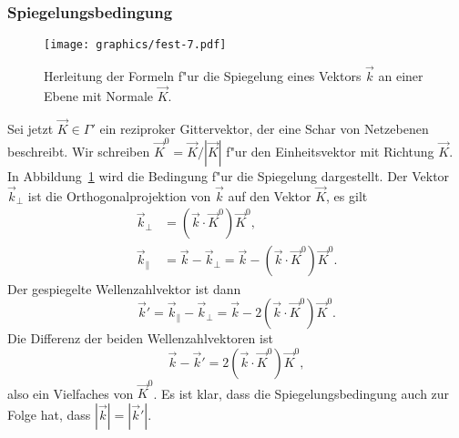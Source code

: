 \subsubsection{Spiegelungsbedingung}
%
\begin{figure}
\centering
\texttt{[image: graphics/fest-7.pdf]}
\caption{Herleitung der Formeln f"ur die Spiegelung eines Vektors $\vec k$
an einer Ebene mit Normale $\vec K$.
\label{skript:spiegelungsbedingung}}
\end{figure}
Sei jetzt $\vec K\in\Gamma'$ ein reziproker Gittervektor, der eine
Schar von Netzebenen beschreibt.
Wir schreiben $\vec K^0=\vec K/|\vec K|$ f"ur den Einheitsvektor mit
Richtung $\vec K$.
In Abbildung~\ref{skript:spiegelungsbedingung} wird die Bedingung f"ur die
Spiegelung dargestellt. 
Der Vektor $\vec k_{\perp}$ ist die Orthogonalprojektion von $\vec k$
auf den Vektor $\vec K$, es gilt
\begin{align*}
\vec k_{\perp}&=(\vec k\cdot\vec K^0)\vec K^0,
\\
\vec k_{\|}&=\vec k -\vec k_{\perp} = \vec k-(\vec k\cdot \vec K^0)\vec K^0.
\end{align*}
Der gespiegelte Wellenzahlvektor ist dann
\begin{equation}
\vec k'=\vec k_{\|}-\vec k_{\perp}=\vec k-2(\vec k\cdot\vec K^0)\vec K^0.
\end{equation}
Die Differenz der beiden Wellenzahlvektoren ist
\begin{equation}
\vec k- \vec k'=2(\vec k\cdot\vec K^0)\vec K^0,
\label{skript:wellenzahldifferenz}
\end{equation}
also ein Vielfaches von $\vec K^0$.
Es ist klar, dass die Spiegelungsbedingung auch zur Folge hat, dass
$|\vec k|=|\vec k'|$.

